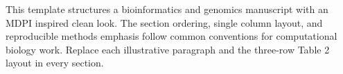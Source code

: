 
This template structures a bioinformatics and genomics manuscript with an MDPI inspired clean look. The section ordering, single column layout, and reproducible methods emphasis follow common conventions for computational biology work. Replace each illustrative paragraph and the three-row Table 2 layout in every section.
